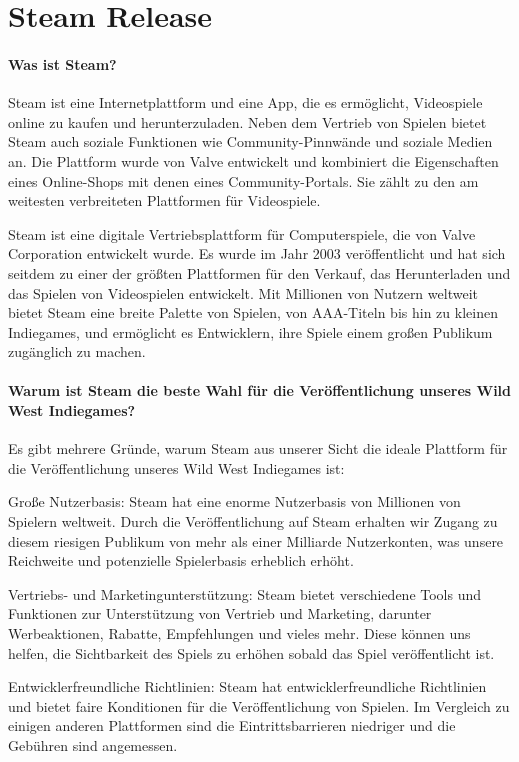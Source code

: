 
\chapter{Steam Release}\label{ch:steamrelease}
\renewcommand{\kapitelautor}{Autor: Nils Hubmann}

%
\subsubsection{Was ist Steam?}\label{subsubsec:Steam-Vorstellung}

Steam ist eine Internetplattform und eine App, die es ermöglicht, Videospiele online zu kaufen und herunterzuladen.
Neben dem Vertrieb von Spielen bietet Steam auch soziale Funktionen wie Community-Pinnwände und soziale Medien an.
Die Plattform wurde von Valve entwickelt und kombiniert die Eigenschaften eines Online-Shops mit denen eines Community-Portals.
Sie zählt zu den am weitesten verbreiteten Plattformen für Videospiele.

Steam ist eine digitale Vertriebsplattform für Computerspiele, die von Valve Corporation entwickelt wurde.
Es wurde im Jahr 2003 veröffentlicht und hat sich seitdem zu einer der größten Plattformen für den Verkauf, das Herunterladen und das Spielen von Videospielen entwickelt.
Mit Millionen von Nutzern weltweit bietet Steam eine breite Palette von Spielen, von AAA-Titeln bis hin zu kleinen Indiegames, und ermöglicht es Entwicklern, ihre Spiele einem großen Publikum zugänglich zu machen.

\subsubsection{Warum ist Steam die beste Wahl für die Veröffentlichung unseres Wild West Indiegames?}\label{subsubsec:Warum-Steam}

Es gibt mehrere Gründe, warum Steam aus unserer Sicht die ideale Plattform für die Veröffentlichung unseres Wild West Indiegames ist:

\begin{liste}
   \item Große Nutzerbasis: Steam hat eine enorme Nutzerbasis von Millionen von Spielern weltweit. Durch die Veröffentlichung auf Steam erhalten wir Zugang zu diesem riesigen Publikum von mehr als einer Milliarde Nutzerkonten, was unsere Reichweite und potenzielle Spielerbasis erheblich erhöht.
   \item Vertriebs- und Marketingunterstützung: Steam bietet verschiedene Tools und Funktionen zur Unterstützung von Vertrieb und Marketing, darunter Werbeaktionen, Rabatte, Empfehlungen und vieles mehr. Diese können uns helfen, die Sichtbarkeit des Spiels zu erhöhen sobald das Spiel veröffentlicht ist.
   \item Entwicklerfreundliche Richtlinien: Steam hat entwicklerfreundliche Richtlinien und bietet faire Konditionen für die Veröffentlichung von Spielen. Im Vergleich zu einigen anderen Plattformen sind die Eintrittsbarrieren niedriger und die Gebühren sind angemessen.
\end{liste}

